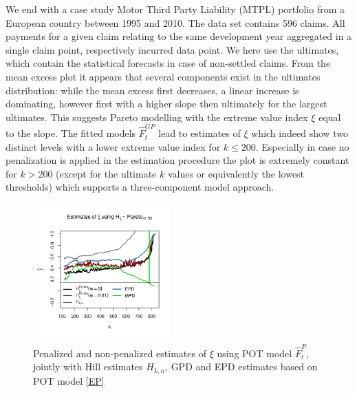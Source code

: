 \documentclass[a4paper,11pt]{article}
\begin{document}
We end with a case study Motor Third Party Liability (MTPL) portfolio from a European country between 1995 and 2010. The data set contains 596 claims. 
All payments for a given claim relating to the same development year  aggregated in a single claim point, respectively incurred data point. We here use the ultimates, which contain the statistical forecasts in case of non-settled claims. From the mean excess plot it appears that several components exist in the ultimates distribution: while the mean excess first decreases, a linear increase is dominating, however first with a higher slope then ultimately for the largest ultimates. This suggests Pareto modelling with the extreme value index $\xi$ equal to the slope. The fitted models $\hat{F}^{GP}_t$ lead to estimates of $\xi$ which indeed show two distinct levels with a lower extreme value index for $k \leq 200$. Especially in case no penalization is applied in the estimation procedure the plot is extremely constant for $k > 200$ (except for the ultimate $k$ values or equivalently the lowest thresholds) which supports a three-component model approach. 
\begin{figure}[th]
	\centering
\includegraphics[width=0.47\textwidth]{xi_m95.pdf}        
	\caption{\small Penalized and non-penalized estimates of $\xi$ using POT model $\hat{F}^{P}_t$, jointly with Hill estimates $H_{k,n}$, GPD and EPD estimates based on POT model \eqref{EP}} 
\end{figure}
\end{document}
